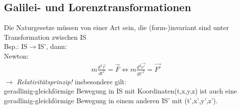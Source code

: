 \subsection{Galilei- und Lorenztransformationen}
Die Naturgesetze müssen von einer Art sein, die (form-)invariant sind unter Transformation zwischen IS\\
Bsp.: IS$\rightarrow$IS', dann:\\
Newton:
\begin{align*}
m\frac{d^2 \vec{r}}{dt^{2}}=\vec{F} \Leftrightarrow m\frac{d^{2}\vec{r'}}{dt'^{2}}=\vec{F'}
\end{align*}
$\rightarrow$ \emph{Relativitätsprinzip!} insbesondere gilt:\\
geradlinig-gleichförmige Bewegung in IS mit Koordinaten(t,x,y,z) ist auch eine
geradlinig-gleichförmige Bewegung in einem anderen IS' mit (t',x',y',z').
\\
